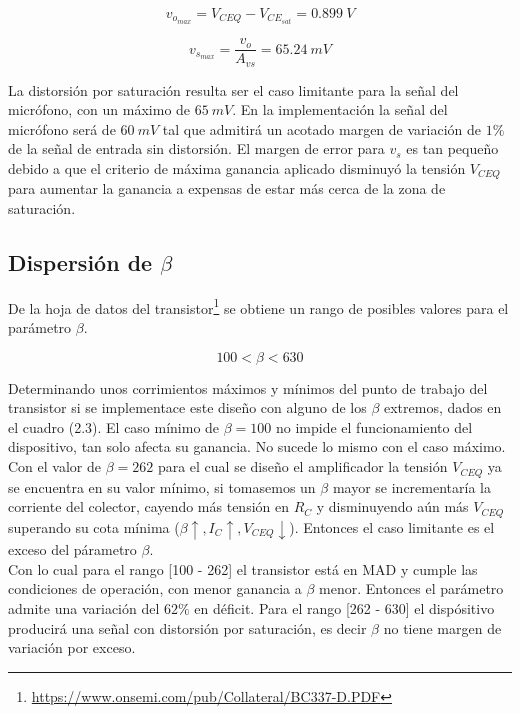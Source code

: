 \documentclass[a4paper, 10pt, spanish]{article}
\numberwithin{equation}{section}
\numberwithin{table}{section}
\begin{document}
\begin{equation}
v_{o}_{max} = V_{CEQ} - V_{CE}_{sat} = 0.899\ V \nonumber
\end{equation}

\begin{equation}
v_s_{max} = \frac{v_o}{A_{vs}} = 65.24\ mV \nonumber
\end{equation}

La distorsión por saturación resulta ser el caso limitante para la señal del micrófono, con un máximo de $65\ mV$. En la implementación la señal del micrófono será de $60\ mV$ tal que admitirá un acotado margen de variación de $1 \%$ de la señal de entrada sin distorsión. El margen de error para $v_s$ es tan pequeño debido a que el criterio de máxima ganancia aplicado disminuyó la tensión $V_{CEQ}$ para aumentar la ganancia a expensas de estar más cerca de la zona de saturación. 


\subsection{Dispersión de $\beta$}
De la hoja de datos del transistor\footnote{\url{https://www.onsemi.com/pub/Collateral/BC337-D.PDF}} se obtiene un rango de posibles valores para el parámetro $\beta$.

\begin{equation}
100 < \beta < 630 \nonumber
\end{equation}

Determinando unos corrimientos máximos y mínimos del punto de trabajo del transistor si se implementace este diseño con alguno de los $\beta$ extremos, dados en el cuadro (2.3). El caso mínimo de $\beta = 100$ no impide el funcionamiento del dispositivo, tan solo afecta su ganancia. No sucede lo mismo con el caso máximo. Con el valor de $\beta = 262$ para el cual se diseño el amplificador la tensión $V_{CEQ}$ ya se encuentra en su valor mínimo, si tomasemos un $\beta$ mayor se incrementaría la corriente del colector, cayendo más tensión en $R_C$ y disminuyendo aún más $V_{CEQ}$ superando su cota mínima ($\beta \uparrow, I_C \uparrow, V_{CEQ} \downarrow $). Entonces el caso limitante es el exceso del párametro $\beta$.\\

Con lo cual para el rango [100 - 262] el transistor está en MAD y cumple las condiciones de operación, con menor ganancia a $\beta$ menor. Entonces el parámetro admite una variación del $62\%$ en déficit. Para el rango [262 - 630] el dispósitivo producirá una señal con distorsión por saturación, es decir $\beta$ no tiene margen de variación por exceso.\\
\end{document}
